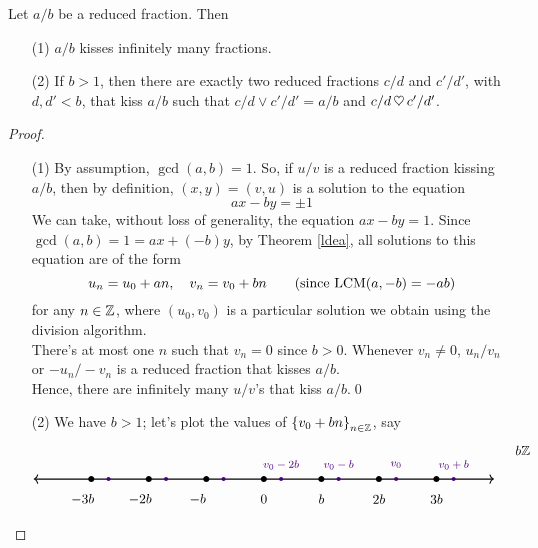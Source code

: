 \vspace*{1em}

\begin{proposition}\label{medsand}
Let $a/b$ be a reduced fraction. Then 
\begin{itemize}
\item[(1)] $a/b$ kisses infinitely many fractions.
\item[(2)] If $b>1$, then there are exactly two reduced fractions $c/d$ and $c'/d'$, with $d,d'<b$, that kiss $a/b$ such that $c/d \vee c'/d' = a/b$ and $c/d\,\heartsuit\, c'/d'$. 
\end{itemize}
\end{proposition}
\begin{proof}
\hfill
\begin{itemize}
\item[(1)] By assumption, $\gcd(a,b) = 1$. So, if $u/v$ is a reduced fraction kissing $a/b$, then by definition, $(x,y) = (v,u)$ is a solution to the equation
\[ax - by = \pm 1\]
We can take, without loss of generality, the equation $ax - by = 1$. Since $\gcd(a,b) = 1 = ax + (-b)y$, by Theorem \ref{ldea}, all solutions to this equation are of the form
\[u_n = u_0 + an,\quad v_n = v_0 + bn\qquad \text{(since $\operatorname{LCM}(a,-b) = -ab$)}\]
for any $n\in \mathbb Z$, where $(u_0,v_0)$ is a particular solution we obtain using the division algorithm.\\[1em]
There's at most one $n$ such that $v_n = 0$ since $b>0$. Whenever $v_n \neq 0$, $u_n/v_n$ or $-u_n/-v_n$ is a reduced fraction that kisses $a/b$.\\[1em]
Hence, there are infinitely many $u/v$'s that kiss $a/b$.\qed
\item[(2)] We have $b > 1$; let's plot the values of $\left\{v_0 + bn\right\}_{n \in \mathbb Z}$, say
\[\begin{tikzpicture}[scale=1.5]
    \draw[<->,thick] (-4,0)--(4,0);
	\foreach \x in {-3,-2,-1,0,1,2,3}
    {
    \fill (\x,0) circle (1.5pt);
    }
    \foreach \y in {3.3,2.3,1.3,0.3,-0.7,-1.7,-2.7}
    {
    \fill[color=indigo] (\y,0) circle (1pt);
    }
    \node[] at (0,-0.35) {$0$};
    \node[] at (1,-0.35) {$b$};
    \node[] at (2,-0.35) {$2b$};
    \node[] at (3,-0.35) {$3b$};
    \node[] at (-1.15,-0.35) {$-b$};
    \node[] at (-2.15,-0.35) {$-2b$};
    \node[] at (-3.15,-0.35) {$-3b$};
    \node[] at (4.5,0.5) {$b\zz$};
    \node[color=indigo] at (2.3,0.25) {\footnotesize $v_0$};
    \node[color=indigo] at (3.3,0.25) {\footnotesize $v_0 + b$};
    \node[color=indigo] at (1.3,0.25) {\footnotesize $v_0-b$};
    \node[color=indigo] at (0.3,0.25) {\footnotesize $v_0-2b$};

\end{tikzpicture}\]
\end{itemize}
\end{proof}
